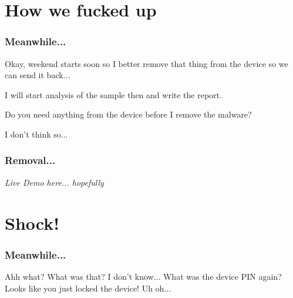 \documentclass[12pt,a4paper]{beamer}
\newcommand{\mybox}[1]{\par\noindent\colorbox{shadecolor}
{\color{textcolor}\parbox{\dimexpr\textwidth-2\fboxsep\relax}{\fontsize{3em}{3.5em}\selectfont\textbf{{#1}}}}}
\begin{document}
\section{How we fucked up}

\begin{frame}
\frametitle{Meanwhile...}
\begin{dialogue}
 Okay, weekend starts soon so I better remove that thing from the device so we can send it back...

 I will start analysis of the sample then and write the report.

 Do you need anything from the device before I remove the malware?

 I don't think so...
\end{dialogue}
\end{frame}


\begin{frame}
\frametitle{Removal...}
\textit{Live Demo here... hopefully}
\end{frame}




\section{Shock!}
\begin{frame}
	\frametitle{Meanwhile...}
	\begin{dialogue}
	 Ahh what?
	 What was that?
	 I don't know... What was the device PIN again? 
	 Looks like you just locked the device!
	 Uh oh...
	\end{dialogue}
\end{frame}

{
\begin{frame}[plain]
\end{frame}
}
\end{document}
